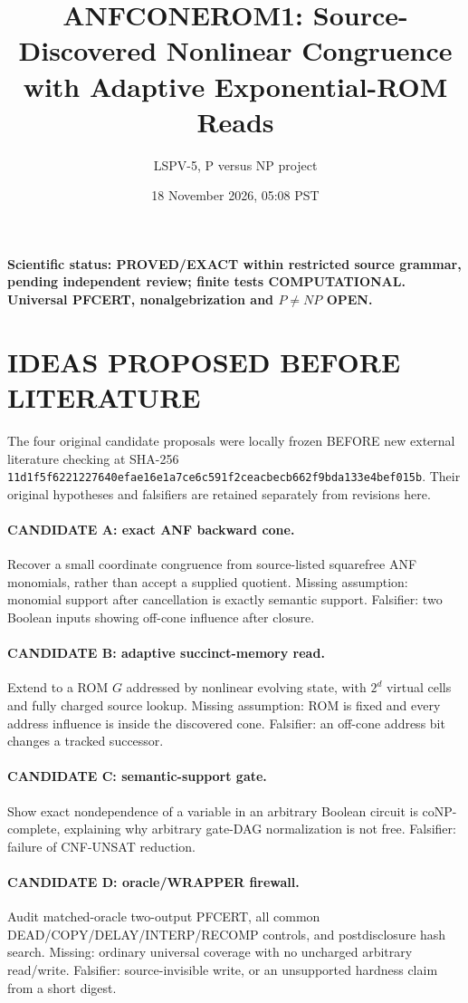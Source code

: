 \documentclass[11pt]{article}
\title{ANFCONEROM1: Source-Discovered Nonlinear Congruence with Adaptive Exponential-ROM Reads}
\author{LSPV-5, P versus NP project}
\date{18 November 2026, 05:08 PST}
\begin{document}
\maketitle
\noindent\textbf{Scientific status: PROVED/EXACT within restricted source grammar, pending independent review; finite tests COMPUTATIONAL. Universal PFCERT, nonalgebrization and $P\ne NP$ OPEN.}

\section{IDEAS PROPOSED BEFORE LITERATURE}
The four original candidate proposals were locally frozen BEFORE new external literature checking at SHA-256 \texttt{11d1f5f6221227640efae16e1a7ce6c591f2ceacbecb662f9bda133e4bef015b}. Their original hypotheses and falsifiers are retained separately from revisions here.
\paragraph{CANDIDATE A: exact ANF backward cone.} Recover a small coordinate congruence from source-listed squarefree ANF monomials, rather than accept a supplied quotient. Missing assumption: monomial support after cancellation is exactly semantic support. Falsifier: two Boolean inputs showing off-cone influence after closure.
\paragraph{CANDIDATE B: adaptive succinct-memory read.} Extend to a ROM $G$ addressed by nonlinear evolving state, with $2^d$ virtual cells and fully charged source lookup. Missing assumption: ROM is fixed and every address influence is inside the discovered cone. Falsifier: an off-cone address bit changes a tracked successor.
\paragraph{CANDIDATE C: semantic-support gate.} Show exact nondependence of a variable in an arbitrary Boolean circuit is coNP-complete, explaining why arbitrary gate-DAG normalization is not free. Falsifier: failure of CNF-UNSAT reduction.
\paragraph{CANDIDATE D: oracle/WRAPPER firewall.} Audit matched-oracle two-output PFCERT, all common DEAD/COPY/DELAY/INTERP/RECOMP controls, and postdisclosure hash search. Missing: ordinary universal coverage with no uncharged arbitrary read/write. Falsifier: source-invisible write, or an unsupported hardness claim from a short digest.
\end{document}
